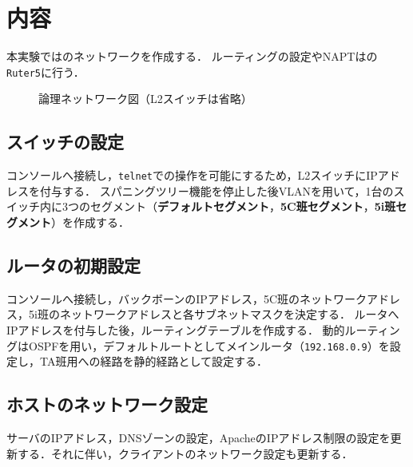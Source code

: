 \section{内容}
本実験ではのネットワークを作成する．
ルーティングの設定やNAPTはの\texttt{Ruter5}に行う．
\begin{figure}
    \centering
    
    \caption{論理ネットワーク図（L2スイッチは省略）}
    \label{fig:ネットワーク図}
\end{figure}
\subsection{スイッチの設定}
コンソールへ接続し，\texttt{telnet}での操作を可能にするため，L2スイッチにIPアドレスを付与する．
スパニングツリー機能を停止した後VLANを用いて，1台のスイッチ内に3つのセグメント（\textbf{デフォルトセグメント}，\textbf{5C班セグメント}，\textbf{5i班セグメント}）を作成する．
\subsection{ルータの初期設定}
コンソールへ接続し，バックボーンのIPアドレス，5C班のネットワークアドレス，5i班のネットワークアドレスと各サブネットマスクを決定する．
ルータへIPアドレスを付与した後，ルーティングテーブルを作成する．
動的ルーティングはOSPFを用い，デフォルトルートとしてメインルータ（\texttt{192.168.0.9}）を設定し，TA班用への経路を静的経路として設定する．
\subsection{ホストのネットワーク設定}
サーバのIPアドレス，DNSゾーンの設定，ApacheのIPアドレス制限の設定を更新する．それに伴い，クライアントのネットワーク設定も更新する．
